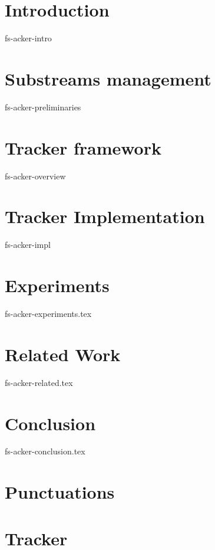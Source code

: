 \documentclass{vldb}
\newcommand {\tracker} {Tracker}
\begin{document}

\thispagestyle{empty}

\section {Introduction}
 {fs-acker-intro}

\section{Substreams management}
 {fs-acker-preliminaries}

\section{Tracker framework}
 {fs-acker-overview}

\section{Tracker Implementation}
 {fs-acker-impl}

\section {Experiments}
 {fs-acker-experiments.tex}

\section{Related Work}
 {fs-acker-related.tex}

\section {Conclusion}
 {fs-acker-conclusion.tex}

\appendix 
\section {Punctuations} \label{appendix:punctuations-proof}
\section {\tracker} \label{appendix:tracker-proof}


% 

\end{document}
